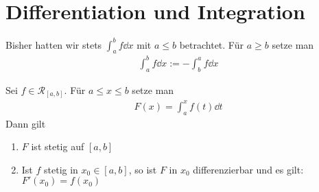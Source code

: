 
\cleardoublepage

\section{Differentiation und Integration}

\begin{Bemerkung}{
	Bisher hatten wir stets $\int_a^b f \dd{x}$ mit $ a \leq b$ betrachtet.
	Für $a \geq b$ setze man 
	\begin{align*}
		\int_a^b f \dd{x} := - \int_b^a f \dd{x}
	\end{align*}
}\end{Bemerkung}

\begin{Satz}{\label{vl_12_satz_01}
	Sei $f \in \mathcal{R}_{[a,b]}$. Für $ a \leq x \leq b$ setze man 
	\begin{align*}
		F(x) = \int_a^x f(t) \dd{t}
	\end{align*}
	Dann gilt
	\begin{enumerate}
		\item $F$ ist stetig auf $[a,b]$
		\item Ist $f$ stetig in $x_0 \in [a,b]$, so ist $F$ in $x_0$ differenzierbar 
		und es \linebreak gilt: $F'(x_0) = f(x_0)$
	\end{enumerate}
}\end{Satz}


